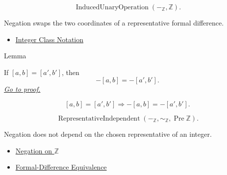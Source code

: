 \begin{remark*}
\[
\operatorname{InducedUnaryOperation}(-_{\mathbb{Z}},\mathbb{Z}).
\]
\end{remark*}

\begin{remark*}[Interpretation]
Negation swaps the two coordinates of a representative formal difference.
\end{remark*}

\begin{dependencies}
\begin{itemize}
  \item \hyperref[def:integer-class-notation]{Integer Class Notation}
\end{itemize}
\end{dependencies}

\begin{lemmabox}{Lemma}
\begin{lemma}
\label{lem:negation-on-z-classes-respects-equivalence}
If $[a,b]=[a',b']$, then
\[
-[a,b]=-[a',b'].
\]
\hyperref[prf:negation-on-z-classes-respects-equivalence]{\textit{Go to proof.}}
\end{lemma}
\end{lemmabox}

\begin{remark*}
\[
[a,b]=[a',b']
\Longrightarrow
-[a,b]=-[a',b'].
\]
\end{remark*}

\begin{remark*}
\[
\operatorname{RepresentativeIndependent}(-_{\mathbb{Z}},\sim_{\mathbb{Z}},\operatorname{Pre}\mathbb{Z}).
\]
\end{remark*}

\begin{remark*}[Interpretation]
Negation does not depend on the chosen representative of an integer.
\end{remark*}

\begin{dependencies}
\begin{itemize}
  \item \hyperref[def:negation-on-z-classes]{Negation on $\mathbb{Z}$}
  \item \hyperref[def:formal-difference-equivalence]{Formal-Difference Equivalence}
\end{itemize}
\end{dependencies}

